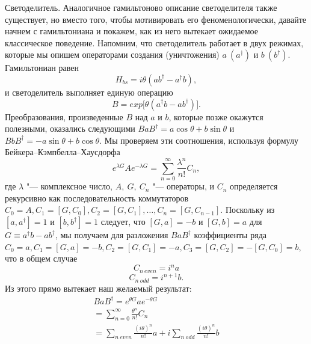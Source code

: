 \begin{multicols}{2}
{        Светоделитель. Аналогичное гамильтоново описание светоделителя также существует, но
        вместо того, чтобы мотивировать его феноменологически, давайте начнем с гамильтониана и покажем, как из него вытекает ожидаемое классическое поведение.
        Напомним, что светоделитель работает в двух режимах, которые мы опишем операторами создания (уничтожения) $a~(a^{\dagger})$ и $b~(b^{\dagger})$. Гамильтониан равен 
        \begin{equation}
            H_{bs}=i\theta(ab^{\dagger}-a^{\dagger}b),
        \end{equation}
        и светоделитель выполняет единую операцию
        \begin{equation}
            B=exp\big[\theta(a^{\dagger}b-ab^{\dagger})\big].
        \end{equation}
        Преобразования, произведенные $B$ над $a$ и $b$, которые позже окажутся полезными, оказались следующими 
        $BaB^{\dagger}=a\cos{\theta}+b\sin{\theta}$ и $BbB^{\dagger}=-a\sin{\theta}+b\cos{\theta}$.
        Мы проверяем эти соотношения, используя формулу Бейкера–Кэмпбелла–Хаусдорфа
        \begin{equation}
            e^{\lambda G}Ae^{-\lambda G}=\sum_{n = 0}^{\infty}  \frac{\lambda^n}{n!}C_n,
        \end{equation}
        где $\lambda$ "--- комплексное число, $A,~G,~C_n$ "--- операторы, и $C_n$ определяется рекурсивно как последовательность коммутаторов 
        $C_0=A,C_1=[G,C_0],C_2=[G,C_1],\ldots,C_n=[G,C_{n-1}].$ Поскольку из $[a,a^{\dagger}] = 1$ и $[b,b^{\dagger}]=1$ следует, что $[G,a]=-b$ и $[G,b]=a$ 
        для $G\equiv a^{\dagger}b-ab^{\dagger}$, мы получаем для разложения $BaB^{\dagger}$ коэффициенты ряда $C_0=a,C_1=[G,a]=-b,C_2=[G,C_1]=-a,C_3=[G,C_2]=-[G,C_0]=b$, что в общем случае 
        \begin{equation}
            C_{n~even} = i^na
        \end{equation}
        \begin{equation}
            C_{n~odd} = i^{n+1}b.
        \end{equation}
        Из этого прямо вытекает наш желаемый результат:
        \begin{equation}
            \begin{split}
                BaB^{\dagger}=e^{\theta G}ae^{-\theta G} \\
                = \sum_{n = 0}^{\infty} \frac{\theta^n}{n!}C_n \\
                = \sum_{n~even}^{}  \frac{(i\theta)^n}{n!}a+i \sum_{n~odd}^{} \frac{(i\theta)^n}{n!}b \\

\end{split}
\end{equation}}
\end{multicols}
